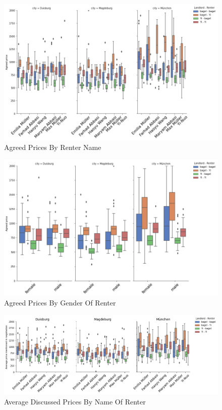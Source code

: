 \documentclass[runningheads]{llncs}
\begin{document}
\begin{figure}[h]
    \includegraphics[width=1\textwidth]{plots/agreed_pricesanswer_name.png}
    \caption[eval]{Agreed Prices By Renter Name}
    \label{fig:name_agreedprice}
\end{figure}

\begin{figure}[h]
    \includegraphics[width=1\textwidth]{plots/agreed_pricesgender.png}
    \caption[eval]{Agreed Prices By Gender Of Renter}
    \label{fig:gender_agreedprice}
\end{figure}

\begin{figure}[h]
    \includegraphics[width=1\textwidth]{plots/name_box.png}
    \caption[eval]{Average Discussed Prices By Name Of Renter}
    \label{fig:name_avgprice}
\end{figure}
\end{document}
